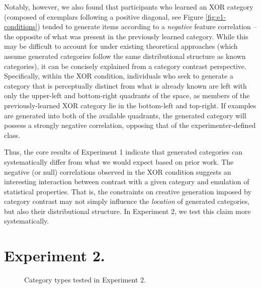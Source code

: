 \documentclass[12pt]{article}
\begin{document}
\begin{flushleft}
Notably, however, we also found that participants who learned an XOR category (composed of exemplars following a positive diagonal, see Figure \ref{fig:e1-conditions}) tended to generate items according to a {\em negative} feature correlation -- the opposite of what was present in the previously learned category. While this may be difficult to account for under existing theoretical approaches (which assume generated categories follow the same distributional structure as known categories), it can be concisely explained from a category contrast perspective. Specifically, within the XOR condition, individuals who seek to generate a category that is perceptually distinct from what is already known are left with only the upper-left and bottom-right quadrants of the space, as members of the previously-learned XOR category lie in the bottom-left and top-right. If examples are generated into both of the available quadrants, the generated category will possess a strongly negative correlation, opposing that of the experimenter-defined class.

Thus, the core results of Experiment 1 indicate that generated categories can systematically differ from what we would expect based on prior work. The negative (or null) correlations observed in the XOR condition suggests an interesting interaction between contrast with a given category and emulation of statistical properties. That is, the constraints on creative generation imposed by category contrast may not simply influence the {\em location} of generated categories, but also their distributional structure. In Experiment 2, we test this claim more systematically.


\section{Experiment 2.}

\begin{figure}
    \begin{center}
    
    \caption{Category types tested in Experiment 2.}
    \label{fig:e2-conditions}
    \end{center}
\end{figure}


\end{flushleft}
\end{document}
